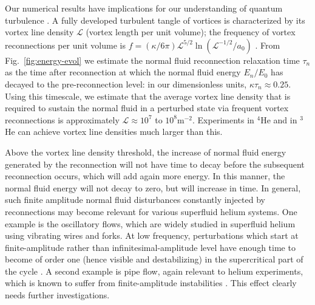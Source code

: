 \documentclass[9pt,twocolumn,twoside]{pnas-new}
\def\red#1{\textcolor{red}{#1}}
\begin{document}
Our numerical results have implications for our understanding of 
quantum turbulence \cite{BSS2023}.
A fully developed turbulent tangle of vortices is
characterized by its vortex line density $\mathcal{L}$ (vortex length
per unit volume); the frequency 
of vortex reconnections per unit volume is 
${f=(\kappa/6\pi)\mathcal{L}^{5/2}\ln(\mathcal{L}^{-1/2}/a_0)}$
\cite{barenghi2004}. From Fig.~\ref{fig:energy-evol} we estimate the 
normal fluid reconnection relaxation time $\tau_n$ as the time 
after reconnection at which the normal fluid energy $E_n/E_0$ has decayed
to the pre-reconnection level: in our dimensionless units, $\kappa \tau_n \approx 0.25$. 
Using this timescale, we estimate that
the average vortex line density that is required to sustain the normal fluid 
in a perturbed state via frequent vortex reconnections is approximately
$\mathcal{L} \approx 10^7$ to $10^8\mathrm{m}^{-2}$. 
Experiments in $^4$He
\cite{schwarz1981,milliken1982,roche2008,roche2007,Babuin2014} and in $^3$He
\cite{bradley2006} can achieve vortex line densities much larger than this.

Above the vortex line density threshold, the increase of normal fluid energy generated by the reconnection will not have time to decay before the subsequent reconnection occurs, which will add again more energy. In this manner, the normal fluid energy will not decay to zero, but will increase in time. In general, such finite amplitude normal fluid disturbances constantly injected by reconnections may become relevant for various superfluid helium systems. One example is the oscillatory flows, which are widely studied in superfluid helium using vibrating wires and forks. At low frequency, perturbations which start at finite-amplitude rather than infinitesimal-amplitude level have enough time to become of order one (hence visible and destabilizing) in the supercritical part of the cycle \cite{barenghi1989modulated}. A second example is pipe flow, again relevant to helium experiments, which is known to suffer from finite-amplitude instabilities \cite{peixinho2007finite}. This effect clearly needs further investigations.
\end{document}
